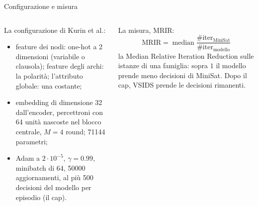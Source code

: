 \documentclass[aspectratio=169]{beamer}
\newcommand{\T}[2]{#2}
\newcommand{\T}[2]{#1}
\begin{document}
\begin{frame}{\T{Configuration and measure}{Configurazione e misura}}
  \begin{columns}[t]
    \begin{column}{0.5\textwidth}
      \T{The configuration of Kurin et al.:}{La configurazione di Kurin et al.:}
      \begin{itemize}
        \item \T{node features: 2-dimensional one-hot (variable or clause); edge features: the
              polarity; the global attribute: a constant;}%
              {feature dei nodi: one-hot a 2 dimensioni (variabile o clausola); feature degli
              archi: la polarit\`a; l'attributo globale: una costante;}
        \item \T{embeddings of size 32 from the encoder, perceptrons with 64 hidden units in
              the core, $M=4$ rounds; 71144 parameters;}%
              {embedding di dimensione 32 dall'encoder, percettroni con 64 unit\`a nascoste nel
              blocco centrale, $M=4$ round; 71144 parametri;}
        \item \T{Adam at $2\cdot10^{-5}$, $\gamma=0.99$, minibatches of 64, 50000 updates, at
              most 500 decisions of the model per episode (the cap).}%
              {Adam a $2\cdot10^{-5}$, $\gamma=0.99$, minibatch di 64, 50000 aggiornamenti, al
              pi\`u 500 decisioni del modello per episodio (il cap).}
      \end{itemize}
    \end{column}
    \begin{column}{0.5\textwidth}
      \T{The measure, MRIR:}{La misura, MRIR:}
      \[
        \text{MRIR}=\operatorname{median}\frac{\#\text{iter}_{\text{MiniSat}}}{\#\text{iter}_{\text{\T{model}{modello}}}}
      \]
      \T{the Median Relative Iteration Reduction over the instances of a family: above $1$ the
      model takes fewer decisions than MiniSat. After the cap, VSIDS takes the remaining
      decisions.}%
      {la Median Relative Iteration Reduction sulle istanze di una famiglia: sopra $1$ il
      modello prende meno decisioni di MiniSat. Dopo il cap, VSIDS prende le decisioni
      rimanenti.}
    \end{column}
  \end{columns}
\end{frame}
\end{document}

